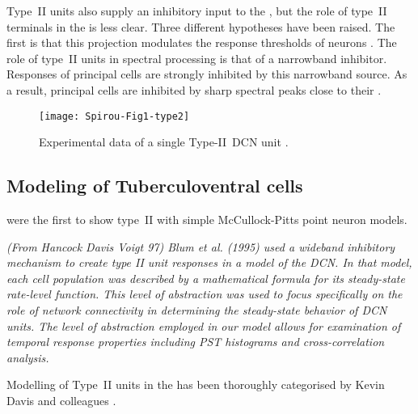 \smallskip{}

Type~II units also supply an inhibitory input to the \VCN
\citep{WickesbergOertel:1990}, but the role of type~II terminals in the
\VCN is less clear. Three different hypotheses have been raised. The ﬁrst
is that this projection modulates the response thresholds of \VCN neurons
\citep{PaoliniClark:1998}.  The role of type~II units in spectral
processing is that of a narrowband inhibitor. Responses of \DCN principal
cells are strongly inhibited by this narrowband source. As a result, \DCN
principal cells are inhibited by sharp spectral peaks close to their \BF
\citep{SpirouDavisEtAl:1999}.

\smallskip{}

\begin{figure}[htb]
  \centering
\texttt{[image: Spirou-Fig1-type2]}
\caption{Experimental data of a single Type-II~DCN unit
  \citep[Fig.~1]{SpirouDavisEtAl:1999}.}
  \label{fig:SpirouFig1}
\end{figure}


\subsection{Modeling of Tuberculoventral cells}

\citet{ArleKim:1991a} were the first to show type~II \EIRA with simple
McCullock-Pitts point neuron models.


{\it (From Hancock Davis Voigt 97) Blum et al. (1995) used a wideband
  inhibitory mechanism to create type II unit responses in a model of
  the DCN. In that model, each cell population was described by a
  mathematical formula for its steady-state rate-level function. This
  level of abstraction was used to focus specifically on the role of
  network connectivity in determining the steady-state behavior of DCN
  units. The level of abstraction employed in our model allows for
  examination of temporal response properties including PST histograms
  and cross-correlation analysis.}

\citep{DunnVetterEtAl:1996} 




Modelling of Type~II units in the \DCN has been thoroughly categorised by
Kevin Davis and colleagues
\citep{YoungDavis:2002,HancockDavisEtAl:2001,DavisYoung:2000,SpirouDavisEtAl:1999,HancockDavisEtAl:1997,DavisVoigt:1996,DavisVoigt:1994,DavisVoigt:1991}.

